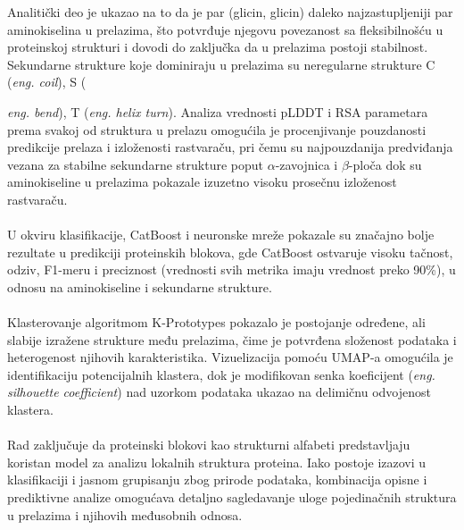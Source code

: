 \documentclass[a4paper,12pt]{article}
\begin{document}
Analitički deo je ukazao na to da je par (glicin, glicin) daleko najzastupljeniji par aminokiselina u prelazima, što potvrđuje njegovu povezanost sa fleksibilnošću u proteinskoj strukturi i dovodi do zaključka da u prelazima postoji stabilnost. Sekundarne strukture koje dominiraju u prelazima su neregularne strukture C (\textit{eng. coil}), S ({\textit{eng. bend}), T ({\textit{eng. helix turn}}). Analiza vrednosti pLDDT i RSA parametara prema svakoj od struktura u prelazu omogućila je procenjivanje pouzdanosti predikcije prelaza i izloženosti rastvaraču, pri čemu su najpouzdanija predviđanja vezana za stabilne sekundarne strukture poput $\alpha$-zavojnica i $\beta$-ploča dok su aminokiseline u prelazima pokazale izuzetno visoku prosečnu izloženost rastvaraču.\\
\\
U okviru klasifikacije, CatBoost i neuronske mreže pokazale su značajno bolje rezultate u predikciji proteinskih blokova, gde CatBoost ostvaruje visoku tačnost, odziv, F1-meru i preciznost (vrednosti svih metrika imaju vrednost preko 90\%), u odnosu na aminokiseline i sekundarne strukture.\\
\\
Klasterovanje algoritmom K-Prototypes pokazalo je postojanje određene, ali slabije izražene strukture među prelazima, čime je potvrđena složenost podataka i heterogenost njihovih karakteristika. Vizuelizacija pomoću UMAP-a omogućila je identifikaciju potencijalnih klastera, dok je modifikovan senka koeficijent (\textit{eng. silhouette coefficient}) nad uzorkom podataka ukazao na delimičnu odvojenost klastera.\\
\\
Rad zaključuje da proteinski blokovi kao strukturni alfabeti predstavljaju koristan model za analizu lokalnih struktura proteina. Iako postoje izazovi u klasifikaciji i jasnom grupisanju zbog prirode podataka, kombinacija opisne i prediktivne analize omogućava detaljno sagledavanje uloge pojedinačnih struktura u prelazima i njihovih međusobnih odnosa.

}
\end{document}
